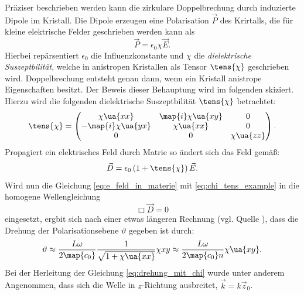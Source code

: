 Präziser beschrieben werden kann die zirkulare Doppelbrechung durch induzierte
Dipole im Kristall. Die Dipole erzeugen eine Polarisation $\vec{P}$ des Krirtalls,
die für kleine elektrische Felder geschrieben werden kann als
\begin{equation*}
\vec{P}=\epsilon_0\chi\vec{E}.
\end{equation*}
Hierbei repärsentiert $\epsilon_0$ die Influenzkonstante und $\chi$ die
\emph{dielektrische Suszeptbilität}, welche in anistropen Kristallen als
Tensor $\tens{\chi}$ geschrieben wird. Doppelbrechung entsteht genau dann, wenn
ein Kristall anistrope Eigenschaften besitzt. Der Beweis dieser Behauptung wird
im folgenden skiziert. Hierzu wird die folgenden dielektrische Suszeptbilität
 $\tens{\chi}$ betrachtet:
\begin{equation}
  \label{eq:chi_tens_example}
  \tens{\chi}=\begin{pmatrix} \chi\ua{xx} & \map{i}\chi\ua{xy} & 0 \\ -\map{i}\chi\ua{yx} & \chi\ua{xx} & 0 \\ 0 & 0 & \chi\ua{zz} \end{pmatrix}.
\end{equation}
Propagiert ein elektrisches Feld durch Matrie so ändert sich das Feld gemäß:
\begin{equation}
  \label{eq:e_feld_in_materie}
  \vec{D}=\epsilon_0\left(1+\tens{\chi}\right)\vec{E}.
\end{equation}
Wird nun die Gleichung \eqref{eq:e_feld_in_materie} mit \eqref{eq:chi_tens_example}
in die homogene Wellengleichung
\begin{equation*}
  \Box \vec{D} = 0
\end{equation*}
eingesetzt, ergbit sich nach einer etwas längeren Rechnung (vgl. Quelle \cite{anleitungv46}),
dass die Drehung der Polarisationsebene $\vartheta$ gegeben ist durch:
\begin{equation}
  \label{eq:drehung_mit_chi}
  \vartheta \approx \frac{L\omega}{2\map{c_0}}\frac{1}{\sqrt{1+\chi\ua{xx}}}\chi{xy}\approx\frac{L\omega}{2\map{c_0}n}\chi\ua{xy}.
\end{equation}
Bei der Herleitung der Gleichung \eqref{eq:drehung_mit_chi} wurde unter anderem Angenommen,
dass sich die Welle in $z$-Richtung ausbreitet, $\vec{k}=k\vec{z}_0$.
